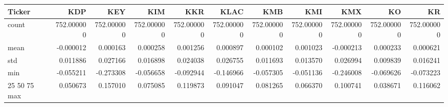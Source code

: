 \begin{tabular}{lrrrrrrrrrr}
\toprule
Ticker & KDP & KEY & KIM & KKR & KLAC & KMB & KMI & KMX & KO & KR \\
\midrule
count & 752.000000 & 752.000000 & 752.000000 & 752.000000 & 752.000000 & 752.000000 & 752.000000 & 752.000000 & 752.000000 & 752.000000 \\
mean & -0.000012 & 0.000163 & 0.000258 & 0.001256 & 0.000897 & 0.000102 & 0.001023 & -0.000213 & 0.000233 & 0.000621 \\
std & 0.011886 & 0.027166 & 0.016898 & 0.024038 & 0.026755 & 0.011693 & 0.013570 & 0.026994 & 0.009839 & 0.016241 \\
min & -0.055211 & -0.273308 & -0.056658 & -0.092944 & -0.146966 & -0.057305 & -0.051136 & -0.246008 & -0.069626 & -0.073223 \\
25%
50%
75%
max & 0.050673 & 0.157010 & 0.075085 & 0.119873 & 0.091047 & 0.081265 & 0.066370 & 0.100741 & 0.038671 & 0.116062 \\
\bottomrule
\end{tabular}
